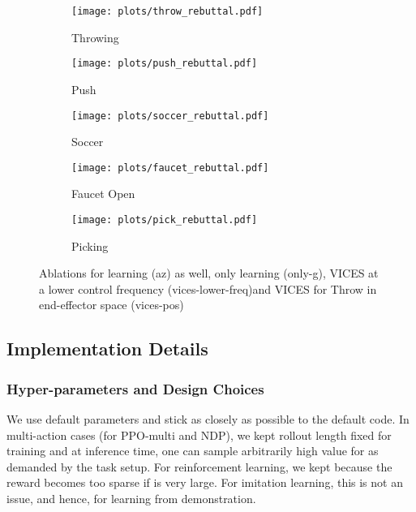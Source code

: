 \documentclass{article}
\begin{document}
\begin{figure}[ht!]
\centering
\begin{subfigure}[b]{0.32\linewidth}
    \texttt{[image: plots/throw\_rebuttal.pdf]}
    \vspace{-0.26in}
    \caption{\small Throwing}
    \label{fig:throw-rl-vices}
\end{subfigure}
\begin{subfigure}[b]{0.32\linewidth}
    \texttt{[image: plots/push\_rebuttal.pdf]}
    \vspace{-0.26in}
    \caption{\small Push}
    \label{fig:pick-rl-vices}
\end{subfigure}
\begin{subfigure}[b]{0.32\linewidth}
    \texttt{[image: plots/soccer\_rebuttal.pdf]}
    \vspace{-0.26in}
    \caption{\small Soccer}
    \label{fig:push-rl-vices}
\end{subfigure}
\begin{subfigure}[b]{0.32\linewidth}
    \texttt{[image: plots/faucet\_rebuttal.pdf]}
    \vspace{-0.26in}
    \caption{\small Faucet Open}
    \label{fig:faucet-rl-vices}
\end{subfigure}
\begin{subfigure}[b]{0.32\linewidth}
    \texttt{[image: plots/pick\_rebuttal.pdf]}
    \vspace{-0.26in}
    \caption{\small Picking}
    \label{fig:soccer-rl-vices}
\end{subfigure}
\vspace{-0.01in}
\caption{\small Ablations for learning  (az) as well, only learning  (only-g), VICES at a lower control frequency (vices-lower-freq)and VICES for Throw in end-effector space (vices-pos)}
\vspace{-0.06in}
\label{fig:abl-vices}
\end{figure}


\subsection{Implementation Details}
\subsubsection*{Hyper-parameters and Design Choices}
We use default parameters and stick as closely as possible to the default code. In multi-action cases (for PPO-multi and NDP), we kept rollout length  fixed for training and at inference time, one can sample arbitrarily high value for  as demanded by the task setup. For reinforcement learning, we kept  because the reward becomes too sparse if  is very large. For imitation learning, this is not an issue, and hence,  for learning from demonstration. 
\end{document}
